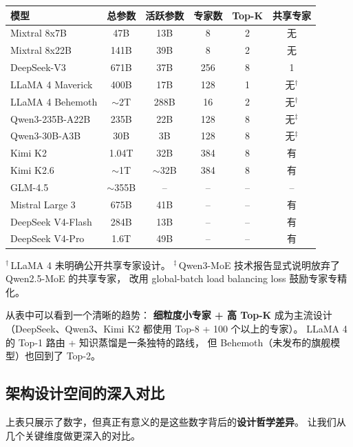 \begin{keybox}
\begin{center}\small
\renewcommand{\arraystretch}{1.3}
\begin{tabular}{lccccc}
  \toprule
  \rowcolor{figLightGray}
  \textbf{模型} & \textbf{总参数} & \textbf{活跃参数}
  & \textbf{专家数} & \textbf{Top-K} & \textbf{共享专家} \\
  \midrule
  Mixtral 8x7B & 47B & 13B & 8 & 2 & 无 \\
  Mixtral 8x22B & 141B & 39B & 8 & 2 & 无 \\
  DeepSeek-V3 & 671B & 37B & 256 & 8 & 1 \\
  LLaMA 4 Maverick & 400B & 17B & 128 & 1 & 无$^\dagger$ \\
  LLaMA 4 Behemoth & $\sim$2T & 288B & 16 & 2 & 无$^\dagger$ \\
  Qwen3-235B-A22B & 235B & 22B & 128 & 8 & 无$^\ddagger$ \\
  Qwen3-30B-A3B & 30B & 3B & 128 & 8 & 无$^\ddagger$ \\
  Kimi K2 & 1.04T & 32B & 384 & 8 & 有 \\
  Kimi K2.6 & $\sim$1T & $\sim$32B & 384 & 8 & 有 \\
  GLM-4.5 & $\sim$355B & -- & -- & -- & -- \\
  Mistral Large 3 & 675B & 41B & -- & -- & 有 \\
  DeepSeek V4-Flash & 284B & 13B & -- & -- & 有 \\
  DeepSeek V4-Pro & 1.6T & 49B & -- & -- & 有 \\
  \bottomrule
\end{tabular}
\end{center}

\small $^\dagger$\,LLaMA 4 未明确公开共享专家设计。
$^\ddagger$\,Qwen3-MoE 技术报告显式说明放弃了 Qwen2.5-MoE 的共享专家，
改用 global-batch load balancing loss 鼓励专家专精化。
\end{keybox}

从表中可以看到一个清晰的趋势：
\textbf{细粒度小专家 + 高 Top-K} 成为主流设计
（DeepSeek、Qwen3、Kimi K2 都使用 Top-8 + 100 个以上的专家）。
LLaMA 4 的 Top-1 路由 + 知识蒸馏是一条独特的路线，
但 Behemoth（未发布的旗舰模型）也回到了 Top-2。

\subsection{架构设计空间的深入对比}

上表只展示了数字，但真正有意义的是这些数字背后的\textbf{设计哲学差异}。
让我们从几个关键维度做更深入的对比。

